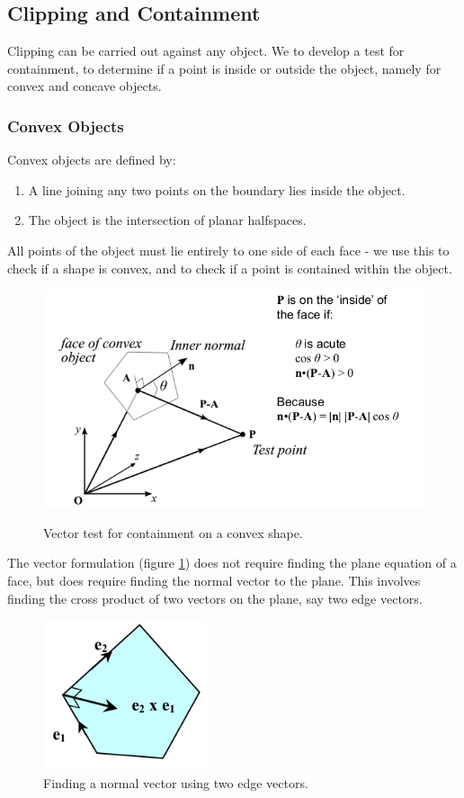 \documentclass[11pt]{article}
\begin{document}
\subsection{Clipping and Containment}
Clipping can be carried out against any object.
We to develop a test for containment, to determine if a point is inside or outside the object, namely for convex and concave objects.

\subsubsection{Convex Objects}
Convex objects are defined by:
\begin{enumerate}
  \item A line joining any two points on the boundary lies inside the object.
  \item The object is the intersection of planar halfspaces.
\end{enumerate}
All points of the object must lie entirely to one side of each face - we use this to check if a shape is convex, and to check if a point is contained within the object.

\begin{figure}[htb!]
  \caption{Vector test for containment on a convex shape.}
  \includegraphics[scale=0.5]{containmentvector}
  \label{fig:vectortest}
  \centering
\end{figure}

The vector formulation (figure \ref{fig:vectortest}) does not require finding the plane equation of a face, but does require finding the normal vector to the plane.
This involves finding the cross product of two vectors on the plane, say two edge vectors.

\begin{figure}[htb!]
  \caption{Finding a normal vector using two edge vectors.}
  \includegraphics[scale=0.5]{edgenormal}
  \centering
\end{figure}
\end{document}
